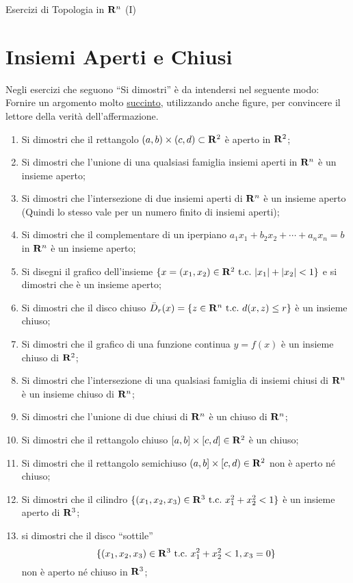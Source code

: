 \documentclass[11pt]{article}\pagestyle{empty}
\begin{document}
\centerline{\Large Esercizi di Topologia in ${\bf R}^n$ (I)} 
\section{Insiemi Aperti e Chiusi}
Negli esercizi che seguono ``Si dimostri'' \`e da intendersi nel seguente modo: Fornire un
argomento molto \underline{succinto}, utilizzando anche figure, per convincere il lettore della 
verit\`a dell'affermazione.
\begin{enumerate}
\item Si dimostri che il rettangolo $(a,b)\times(c,d)\subset{\bf R}^2$ \`e
aperto in ${\bf R}^2$;
\item Si dimostri che l'unione di una qualsiasi famiglia insiemi aperti in ${\bf R}^n$
\`e un insieme aperto;
\item Si dimostri che l'intersezione di due insiemi aperti di ${\bf R}^n$ \`e un
insieme aperto (Quindi lo stesso vale per un numero finito di insiemi aperti);
\item Si dimostri che il complementare di un iperpiano $a_1x_1+b_2x_2+\cdots+a_nx_n=b$
in ${\bf R}^n$ \`e un insieme aperto;
\item Si disegni il grafico dell'insieme $\{x=(x_1,x_2)\in{\bf R}^2\ \mbox{t.c.}\ |x_1| +|x_2|<1\}$ e
si dimostri che \`e un insieme aperto;
\item Si dimostri che il disco chiuso ${\bar D}_r(x)=\{ z\in{\bf R}^n\ \mbox{t.c.} \ d(x,z)\leq r\}$
\`e un insieme chiuso;
\item Si dimostri che il grafico di una funzione continua $y=f(x)$ \`e un insieme chiuso di ${\bf R}^2$;
\item Si dimostri che l'intersezione di una qualsiasi famiglia di insiemi chiusi di ${\bf R}^n$
\`e un insieme chiuso di ${\bf R}^n$;
\item Si dimostri che l'unione di due chiusi di ${\bf R}^n$ \`e un chiuso di ${\bf R}^n$;
\item Si dimostri che il rettangolo chiuso $[a,b]\times[c,d]\in{\bf R}^2$ \`e un chiuso;
\item Si dimostri che il rettangolo semichiuso $(a,b]\times[c,d)\in{\bf R}^2$ non \`e
 aperto n\'e chiuso;
\item Si dimostri che il cilindro $\{ (x_1,x_2,x_3)\in{\bf R}^3\ \mbox{t.c.}\ x_1^2+x_2^2<1\}$
\`e un insieme aperto di ${\bf R}^3$;
\item si dimostri che il disco ``sottile'' 
$$\{ (x_1,x_2,x_3)\in{\bf R}^3\ \mbox{t.c.}\ x_1^2+x_2^2<1, x_3=0\}$$
non \`e aperto n\'e chiuso in  ${\bf R}^3$;
\end{enumerate}
\pagebreak
\end{document}
